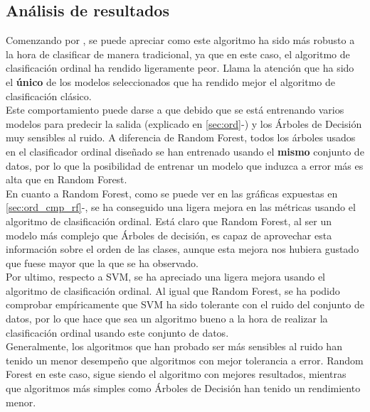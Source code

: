 \subsection{Análisis de resultados}
Comenzando por , se puede apreciar como este algoritmo ha sido más robusto a la hora de clasificar de manera tradicional, ya que en este caso, el algoritmo de clasificación ordinal ha rendido ligeramente peor. Llama la atención que ha sido el \textbf{único} de los modelos seleccionados que ha rendido mejor el algoritmo de clasificación clásico.\\
Este comportamiento puede darse a que debido que se está entrenando varios modelos para predecir la salida (explicado en \ref{sec:ord}-) y los Árboles de Decisión muy sensibles al ruido. A diferencia de Random Forest, todos los árboles usados en el clasificador ordinal diseñado se han entrenado usando el \textbf{mismo} conjunto de datos, por lo que la posibilidad de entrenar un modelo que induzca a error más es alta que en Random Forest.\\
\linebreak
En cuanto a Random Forest, como se puede ver en las gráficas expuestas en \ref{sec:ord_cmp_rf}-, se ha conseguido una ligera mejora en las métricas usando el algoritmo de clasificación ordinal. Está claro que Random Forest, al ser un modelo más complejo que Árboles de decisión, es capaz de aprovechar esta información sobre el orden de las clases, aunque esta mejora nos hubiera gustado que fuese mayor que la que se ha observado.\\
\linebreak
Por ultimo, respecto a SVM, se ha apreciado una ligera mejora usando el algoritmo de clasificación ordinal. Al igual que Random Forest, se ha podido comprobar empíricamente que SVM ha sido tolerante con el ruido del conjunto de datos, por lo que hace que sea un algoritmo bueno a la hora de realizar la clasificación ordinal usando este conjunto de datos.\\
\linebreak
Generalmente, los algoritmos que han probado ser más sensibles al ruido han tenido un menor desempeño que algoritmos con mejor tolerancia a error. Random Forest en este caso, sigue siendo el algoritmo con mejores resultados, mientras que algoritmos más simples como Árboles de Decisión han tenido un rendimiento menor.
\clearpage	
